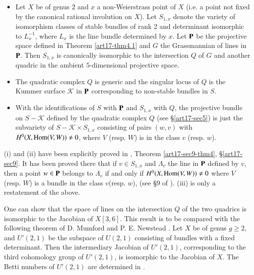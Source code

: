 \begin{theorem}\label{art17-thm6.1}
\begin{itemize}
\item[\rm(i)] Let $X$ be of genus $2$ and $x$ a non-Weierstrass point of $X$ (i.e. a point not fixed by the canonical rational involution on $X$). Let $S_{1,x}$ denote the variety of isomorphism classes of stable bundles of rank 2 and determinant isomorphic to $L^{-1}_{x}$, where $L_{x}$ is the line bundle determined by $x$. Let $\mathbf{P}$ be the projective space defined in Theorem \ref{art17-thm4.1} and $G$ the Grassmannian of lines in $\mathbf{P}$. Then $S_{1,x}$ is canonically isomorphic to the intersection $Q$ of $G$ and another quadric in the ambient $5$-dimensional projective space.

\item[\rm(ii)] The quadratic complex $Q$ is generic and the singular locus of $Q$ is the Kummer surface $\mathscr{K}$ in $\mathbf{P}$ corresponding to non-stable bundles in $S$.

\item[\rm(iii)] With the identifications of $S$ with $\mathbf{P}$ and $S_{1,x}$ with $Q$, the projective bundle on $S-\mathscr{K}$ defined by the quadratic complex $Q$ (see \S\ref{art17-sec5}) is just the subvariety of $S-\mathscr{K}\times S_{1,x}$ consisting of pairs $(w,v)$ with $H^{0}(X,\operatorname{\mathrm{Hom}}(V,W))\neq 0$, where $V$ (resp. $W$) is in the class $v$ (resp. $w$).
\end{itemize}
\end{theorem}

(i) and (ii) have been explicitly proved in \cite{art17-key3}, Theorem \ref{art17-sec9-thm4}, \S\ref{art17-sec9}. It has been proved there that if $v\in S_{1,x}$ and $\Lambda_{v}$ the line in $\mathbf{P}$ defined by $v$, then a point $w\in \mathbf{P}$ belongs to $\Lambda_{v}$ if and only if $H^{0}(X,\operatorname{\mathrm{Hom}}(V,W))\neq 0$ where $V$(resp. $W$) is a bundle in the class $v$(resp. $w$), (see \S9 of \cite{art17-key3}). (iii) is only a restatement of the above.

\begin{remark*}
One can show that the space of lines on the intersection $Q$ of the two quadrics is isomorphic to the Jacobian of $X[3,6]$. This result is to be compared with the following theorem of D. Mumford and P. E. Newstead \cite{art17-key2}. Let $X$ be of genus $g\geq 2$, and $U'(2,1)$ be the subspace of $U(2,1)$ consisting of bundles with a fixed determinant. Then the intermediary Jacobian of $U'(2,1)$, corresponding to the third cohomology group of $U'(2,1)$, is isomorphic to the Jacobian of $X$. The Betti numbers of $U'(2,1)$ are determined in \cite{art17-key5}.
\end{remark*}

